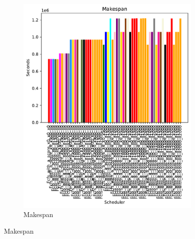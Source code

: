 \documentclass[a4paper]{article}
\begin{document}
\begin{figure}[H]
\begin{subfigure}[b]{0.4\linewidth}\centering\includegraphics[width=1\linewidth]{MBSS/plot/FCFS_Score_2022-01-24->2022-01-24_Makespan_450_128_32_256_4_1024.pdf}\caption{Makespan}\label{2}\end{subfigure}

\end{figure}
\end{document}
